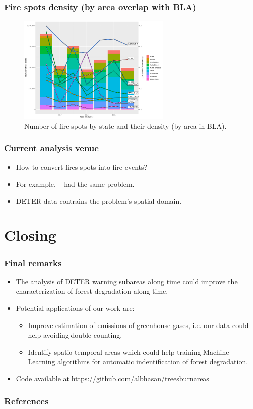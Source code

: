 \documentclass[aspectratio=169]{beamer}
\begin{document}
\begin{frame}
    \frametitle{Fire spots density (by area overlap with BLA)}
    \begin{figure}[h]
        \includegraphics[width=0.65\textwidth]
        {./figures/plot_fire_spots_density_by_state.png}
        \caption{Number of fire spots by state and their density (by 
        area in BLA).}
    \end{figure}
\end{frame}


\begin{frame}
    \frametitle{Current analysis venue}
    \begin{itemize}
        \item How to convert fires spots into fire events?
        \item For example, ~\cite{andela2022} had the same problem.
        \item DETER data contrains the problem's spatial domain.
    \end{itemize}
\end{frame}


\section{Closing}

\begin{frame}
    \frametitle{Final remarks}
    \begin{itemize}
        \item The analysis of DETER warning subareas along time could improve 
            the characterization of forest degradation along time.
        \item Potential applications of our work are:
            \begin{itemize}
                \item Improve estimation of emissions of greenhouse gases, i.e.
                    our data could help avoiding double counting.
                \item Identify spatio-temporal areas which could help training 
                    Machine-Learning algorithms for automatic indentification 
                    of forest degradation.
            \end{itemize}
        \item Code available at 
            \url{https://github.com/albhasan/treesburnareas}
    \end{itemize}
\end{frame}

\begin{frame}[allowframebreaks]
    \frametitle{References}
    
    
\end{frame}
\end{document}
